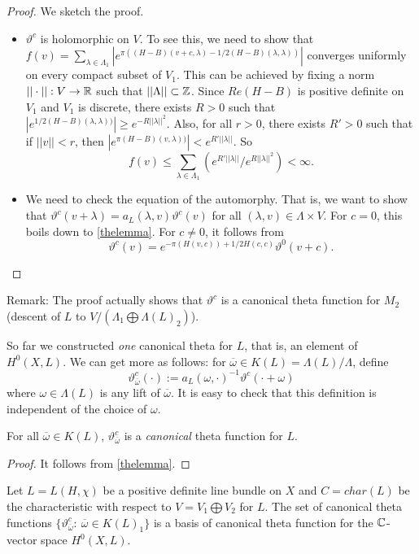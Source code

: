 \begin{proof}
We sketch the proof. 
\begin{itemize}
\item $\vartheta^c$ is holomorphic on $V$. To see this, we need to show that $f(v)=\sum_{\lambda\in \Lambda_1} |e^{\pi((H-B)(v+c,\lambda)-1/2(H-B)(\lambda,\lambda))}|$ converges uniformly on every compact subset of $V_1$. This can be achieved by fixing a norm $||\cdot||:V\to {\mathbb R}$ such that $||\Lambda||\subset {\mathbb Z}$. Since $Re(H-B)$ is positive definite on $V_1$ and $V_1$ is discrete, there exists $R>0$ such that $|e^{1/2(H-B)(\lambda,\lambda))}|\geq e^{-R||\lambda||^2}$. Also, for all $r>0$, there exists $R'>0$ such that if $||v||<r$, then $|e^{\pi(H-B)(v,\lambda))}|<e^{R'||\lambda||}$. So 
$$f(v)\leq \sum_{\lambda\in \Lambda_1} (e^{R'||\lambda||}/e^{R||\lambda||^2})<\infty.$$

\item We need to check the equation of the automorphy. That is, we want to show that $\vartheta^c(v+\lambda)=a_L(\lambda,v)\vartheta^c(v)$ for all $(\lambda,v)\in \Lambda\times V$. For $c=0$, this boils down to \ref{thelemma}. For $c\not=0$, it follows from 
$$\vartheta^c(v)=e^{-\pi(H(v,c))+1/2H(c,c)}\vartheta^0(v+c).$$


\end{itemize}
\end{proof}

Remark: The proof actually shows that $\vartheta^c$ is a canonical theta function for $M_2$ (descent of $L$ to $V/(\Lambda_1\bigoplus \Lambda(L)_2)$). 

So far we constructed \emph{one} canonical theta for $L$, that is, an element of $H^0(X,L)$. We can get more as follows: for $\overline{\omega}\in K(L)=\Lambda(L)/\Lambda$, define 
$$\vartheta_{\overline{\omega}}^c(\cdot):=a_L(\omega,\cdot)^{-1}\vartheta^c(\cdot + \omega)$$
where $\omega\in \Lambda(L)$ is any lift of $\overline{\omega}$. It is easy to check that this definition is independent of the choice of $\omega$. 

\begin{lemma}
For all $\overline{\omega}\in K(L)$, $\vartheta_{\overline{\omega}}^c$ is a \emph{canonical} theta function for $L$. 
\end{lemma}

\begin{proof}
It follows from \ref{thelemma}.
\end{proof}

\begin{theorem}
Let $L=L(H,\chi)$ be a positive definite line bundle on $X$ and $C=char(L)$ be the characteristic with respect to $V=V_1\bigoplus V_2$ for $L$. The set of canonical theta functions
$\{\vartheta_{\overline{\omega}}^c:\ \overline{\omega}\in K(L)_1\}$ is a basis of canonical theta function for the ${\mathbb C}$-vector space $H^0(X,L)$. 
\end{theorem}

